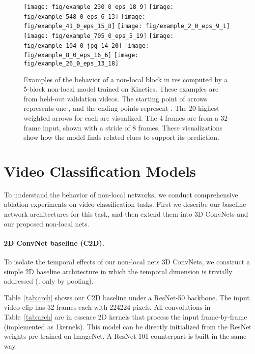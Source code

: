 \documentclass[10pt,twocolumn,letterpaper]{article}
\def\x{}
\begin{document}
\newcommand{\sz}{.48}
\begin{figure*}[t]
\centering
\texttt{[image: fig/example\_230\_0\_eps\_18\_9]}\quad
\texttt{[image: fig/example\_548\_0\_eps\_6\_13]}
\texttt{[image: fig/example\_41\_0\_eps\_15\_8]}\quad
\texttt{[image: fig/example\_2\_0\_eps\_9\_1]}
\texttt{[image: fig/example\_705\_0\_eps\_5\_19]}\quad
\texttt{[image: fig/example\_104\_0\_jpg\_14\_20]}
\texttt{[image: fig/example\_8\_0\_eps\_16\_6]}\quad
\texttt{[image: fig/example\_26\_0\_eps\_13\_18]}
\caption{Examples of the behavior of a non-local block in res computed by a 5-block non-local model trained on Kinetics. These examples are from held-out validation videos.
The starting point of arrows represents one , and the ending points represent . The 20 highest weighted arrows for each  are visualized. The 4 frames are from a 32-frame input, shown with a stride of 8 frames.
These visualizations show how the model finds related clues to support its prediction.}
\label{fig:examples}
\vspace{-.6em}
\end{figure*}


\section{Video Classification Models}

To understand the behavior of non-local networks, we conduct comprehensive ablation experiments on video classification tasks. First we describe our baseline network architectures for this task, and then extend them into 3D ConvNets \cite{Tran2015,Carreira2017} and our proposed non-local nets.

\paragraph{2D ConvNet baseline (C2D).} To isolate the temporal effects of our non-local nets \vs 3D ConvNets, we construct a simple 2D baseline architecture in which the temporal dimension is trivially addressed (\ie, only by pooling).

Table~\ref{tab:arch} shows our C2D baseline under a ResNet-50 backbone. The input video clip has 32 frames each with 224\x224 pixels. All convolutions in Table~\ref{tab:arch} are in essence 2D kernels that process the input frame-by-frame (implemented as 1\x\x kernels). This model can be directly initialized from the ResNet weights pre-trained on ImageNet. A ResNet-101 counterpart is built in the same way.
\end{document}
